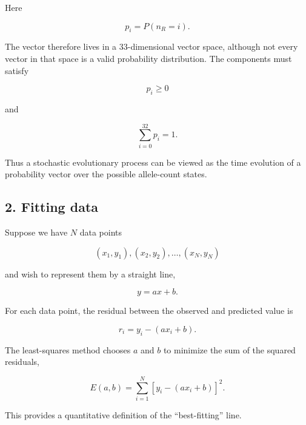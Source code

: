 Here

\begin{equation}
    p_i=P(n_R=i).
\end{equation}

The vector therefore lives in a 33-dimensional vector space, although not every vector in that space is a valid probability distribution.
The components must satisfy

\begin{equation}
    p_i\geq0
\end{equation}

and

\begin{equation}
    \sum_{i=0}^{32}p_i=1.
\end{equation}

Thus a stochastic evolutionary process can be viewed as the time evolution of a probability vector over the possible allele-count states.


\subsection{2. Fitting data}

Suppose we have $N$ data points

\begin{equation}
    (x_1,y_1),(x_2,y_2),\ldots,(x_N,y_N)
\end{equation}

and wish to represent them by a straight line,

\begin{equation}
    y=ax+b.
\end{equation}

For each data point, the residual between the observed and predicted value is

\begin{equation}
    r_i=y_i-(ax_i+b).
\end{equation}

The least-squares method chooses $a$ and $b$ to minimize the sum of the squared residuals,

\begin{equation}
    E(a,b)=\sum_{i=1}^{N}\left[y_i-(ax_i+b)\right]^2.
\end{equation}

This provides a quantitative definition of the ``best-fitting'' line.


